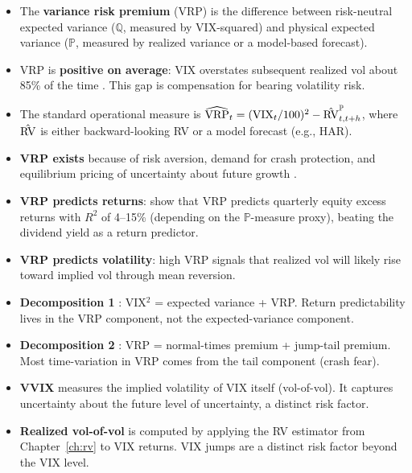 \begin{itemize}[nosep]
  \item The \textbf{variance risk premium} (VRP) is the difference between risk-neutral expected variance ($\mathbb{Q}$, measured by VIX-squared) and physical expected variance ($\mathbb{P}$, measured by realized variance or a model-based forecast).

  \item VRP is \textbf{positive on average}: VIX overstates subsequent realized vol about 85\% of the time \citep{Carr2009}. This gap is compensation for bearing volatility risk.

  \item The standard operational measure is $\widehat{\operatorname{VRP}}_t = (\text{VIX}_t/100)^2 - \hat{\operatorname{RV}}^{\mathbb{P}}_{t,t+h}$, where $\hat{\operatorname{RV}}$ is either backward-looking RV or a model forecast (e.g., HAR).

  \item \textbf{VRP exists} because of risk aversion, demand for crash protection, and equilibrium pricing of uncertainty about future growth \citep{DrechslerYaron2011}.

  \item \textbf{VRP predicts returns}: \citet{BTZ2009} show that VRP predicts quarterly equity excess returns with $R^2$ of 4--15\% (depending on the $\mathbb{P}$-measure proxy), beating the dividend yield as a return predictor.

  \item \textbf{VRP predicts volatility}: high VRP signals that realized vol will likely rise toward implied vol through mean reversion.

  \item \textbf{Decomposition 1} \citep{BekaertHoerova2014}: VIX$^2$ = expected variance + VRP. Return predictability lives in the VRP component, not the expected-variance component.

  \item \textbf{Decomposition 2} \citep{BollerslevTodorov2015}: VRP = normal-times premium + jump-tail premium. Most time-variation in VRP comes from the tail component (crash fear).

  \item \textbf{VVIX} measures the implied volatility of VIX itself (vol-of-vol). It captures uncertainty about the future level of uncertainty, a distinct risk factor.

  \item \textbf{Realized vol-of-vol} is computed by applying the RV estimator from Chapter~\ref{ch:rv} to VIX returns. VIX jumps are a distinct risk factor beyond the VIX level.


\end{itemize}
